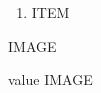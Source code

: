 \documentclass{article}
\begin{document}
\begin{minipage}[t]{0.5\linewidth}
\begin{enumerate}
    \item ITEM
\end{enumerate}
\end{minipage}
\begin{minipage}[t]{0.5\linewidth}
IMAGE
\end{minipage}

\begin{enumext}[mini-env=0.5\linewidth, columns=3,noitemsep]
    \item value
    \miniright
    IMAGE
\end{enumext}
\end{document}
